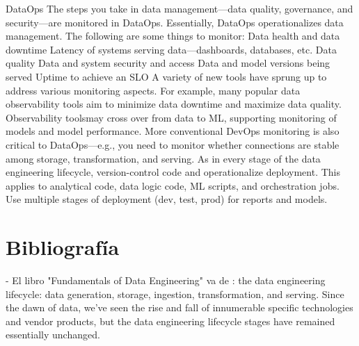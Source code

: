 \documentclass[12pt]{book}
\begin{document}
DataOps
The steps you take in data management—data quality, governance, and
security—are monitored in DataOps. Essentially, DataOps operationalizes
data management. The following are some things to monitor:
Data health and data downtime
Latency of systems serving data—dashboards, databases, etc.
Data quality
Data and system security and access
Data and model versions being served
Uptime to achieve an SLO
A variety of new tools have sprung up to address various monitoring
aspects. For example, many popular data observability tools aim to
minimize data downtime and maximize data quality. Observability toolsmay cross over from data to ML, supporting monitoring of models and
model performance. More conventional DevOps monitoring is also critical
to DataOps—e.g., you need to monitor whether connections are stable
among storage, transformation, and serving.
As in every stage of the data engineering lifecycle, version-control code and
operationalize deployment. This applies to analytical code, data logic code,
ML scripts, and orchestration jobs. Use multiple stages of deployment (dev,
test, prod) for reports and models.

\chapter{Bibliografía}
- El libro "Fundamentals of Data Engineering" va de : the data engineering lifecycle: data generation, storage, ingestion, transformation, and serving. Since the dawn of data, we've seen the rise and fall of innumerable specific technologies and vendor products, but the data engineering lifecycle stages have remained essentially unchanged. 
\end{document}
